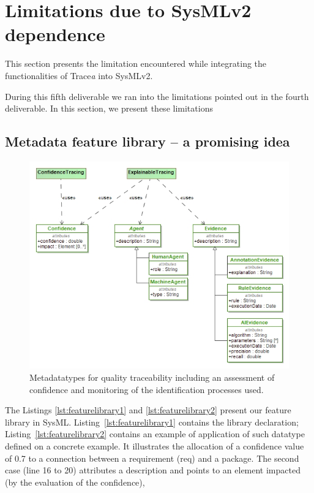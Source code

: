 \section{Limitations due to SysMLv2 dependence}\label{sec:limitation}
This section presents the limitation encountered while integrating the functionalities of Trace\textit{a} into SysMLv2.
\sideboxend

During this fifth deliverable we ran into the limitations pointed out in the fourth deliverable.
In this section, we present these limitations  
 
\subsection{Metadata feature library -- a promising idea}
\begin{figure}[ht]      
	\centering
	\includegraphics[width=.9\linewidth]{images/explainability-datatype.jpg}
	\caption{Metadatatypes for quality traceability including an assessment of confidence and monitoring of the identification processes used.}
	\label{fig:datatypes}
\end{figure}

The Listings \ref{lst:featurelibrary1} and \ref{lst:featurelibrary2} present our feature library {in SysML}. Listing~\ref{lst:featurelibrary1} contains the library declaration; Listing~\ref{lst:featurelibrary2} contains an example of application of such datatype  defined on a concrete example. It illustrates the allocation of a confidence value of 0.7 to a connection between a requirement (req) and a package. The second case (line 16 to 20) attributes a description and points to an element impacted (by the evaluation of the confidence),



